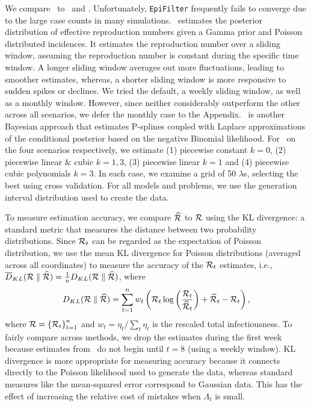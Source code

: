 We compare \RtEstim\ to \EpiEstim\ and \EpiLPS. Unfortunately,
\texttt{EpiFilter} frequently fails to converge due to the large case counts in
many simulations. \EpiEstim\ estimates the posterior distribution of effective
reproduction numbers given a Gamma prior and Poisson distributed incidences. It
estimates the reproduction number over a sliding window, assuming the
reproduction number is constant during the specific time window. A longer
sliding window averages out more fluctuations, leading to smoother estimates,
whereas, a shorter sliding window is more responsive to sudden spikes or
declines. We tried the default, a weekly sliding window, as well as a monthly
window. However, since neither considerably outperform the other across all
scenarios, we defer the monthly case to the Appendix. \EpiLPS\ is another
Bayesian approach that estimates P-splines coupled with Laplace approximations
of the conditional posterior based on the negative Binomial likelihood. For
\RtEstim\ on the four scenarios respectively, we estimate (1) piecewise constant
$k=0$, (2) piecewise linear \& cubic $k=1,3$, (3) piecewise linear $k=1$ and (4)
piecewise cubic polynomials $k=3$. In each case, we examine a grid of 50
$\lambda$s, selecting the best using cross validation. For all models and
problems, we use the generation interval distribution used to create the data. 

To measure estimation accuracy, we compare $\widehat{\mathcal{R}}$ to $\mathcal{R}$ using
the KL divergence: a standard metric that measures the
distance between two probability distributions. Since $\mathcal{R}_t$ can be regarded
as the expectation of Poisson distribution, we use the mean KL divergence for
Poisson distributions (averaged across all coordinates) to measure the accuracy
of the $\mathcal{R}_t$ estimates, i.e., $\overline{D}_{KL}(\mathcal{R} \parallel \widehat{\mathcal{R}}) = 
\frac{1}{n} D_{KL}(\mathcal{R} \parallel \widehat{\mathcal{R}})$, 
where $$D_{KL}(\mathcal{R} \parallel \widehat{\mathcal{R}}) = \sum_{t=1}^n w_t \left(\mathcal{R}_t \log\left(\frac{\mathcal{R}_t}
{\widehat{\mathcal{R}}_t}\right) + \widehat{\mathcal{R}}_t - {\mathcal{R}}_t\right),$$ 
where $\mathcal{R} = \left\{ \mathcal{R}_t \right\}_{t=1}^n$ and 
$w_t = \eta_t / \sum_t \eta_t$ is the rescaled total infectiousness.
To fairly compare across methods, we drop the estimates during the first
week because estimates from \EpiEstim\ do not begin until $t=8$ (using a weekly
window). KL divergence is more appropriate for measuring accuracy because it
connects directly to the Poisson likelihood used to generate the data, whereas
standard measures like the mean-squared error correspond to Gaussian data. This
has the effect of increasing the relative cost of mistakes when $\Lambda_t$ is small.

